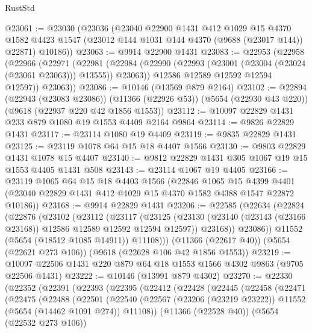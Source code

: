 \begin{lexlean}{RustStd}
\begin{coremodule}
@23061 := @23030
    (@23036
      (@23040
        @22900
        @1431
        @412
        @1029
        @15
        @4370
        @1582
        @4423
        @1547
        (@23012 @144 @1031 @144 @4370 (@9688 (@23017 @144)) @22871)
        @10186))
@23063 := @9914 @22900 @1431
@23083 := @22953
    (@22958
      (@22966
        (@22971
          (@22981
            (@22984 (@22990 (@22993 (@23001 (@23004 (@23024 (@23061 @23063))) @13555)) @23063))
            @12586
            @12589
            @12592
            @12594
            @12597))
        @23063))
@23086 := @10146 (@13569 @879 @2164)
@23102 := @22894
    (@22943 (@23083 @23086))
    (@11366 (@22926 @53))
    (@5654 (@22930 @43 @220))
    (@9618 (@22937 @220 @42 @1856 @1553))
@23112 := @10097 @22829 @1431 @233 @879 @1080 @19 @1553 @4409 @2164 @9864
@23114 := @9826 @22829 @1431
@23117 := @23114 @1080 @19 @4409
@23119 := @9835 @22829 @1431
@23125 := @23119 @1078 @64 @15 @18 @4407 @1566
@23130 := @9803 @22829 @1431 @1078 @15 @4407
@23140 := @9812 @22829 @1431 @305 @1067 @19 @15 @1553 @4405 @1431 @508
@23143 := @23114 @1067 @19 @4405
@23166 := @23119
    @1065
    @64
    @15
    @18
    @4403
    @1566
    (@22846
      @1065
      @15
      @4399
      @4401
      (@23040 @22829 @1431 @412 @1029 @15 @4370 @1582 @4388 @1547 @22872 @10186))
@23168 := @9914 @22829 @1431
@23206 := @22585
    (@22634
      (@22824
        (@22876
          (@23102
            (@23112
              (@23117
                (@23125
                  (@23130 (@23140 (@23143 (@23166 @23168)) @12586 @12589 @12592 @12594 @12597))
                  @23168))
              @23086))
          @11552
          (@5654 (@18512 @1085 @14911))
          @11108)))
    (@11366 (@22617 @40))
    (@5654 (@22621 @273 @106))
    (@9618 (@22628 @106 @42 @1856 @1553))
@23219 := @10097 @22506 @1431 @220 @879 @64 @18 @1553 @1566 @4302 @9863 (@9705 @22506 @1431)
@23222 := @10146 (@13991 @879 @4302)
@23270 := @22330
    (@22352
      (@22391
        (@22393
          (@22395
            (@22412
              (@22428
                (@22445
                  (@22458
                    (@22471
                      (@22475
                        (@22488
                          (@22501
                            (@22540
                              (@22567
                                (@23206 (@23219 @23222))
                                @11552
                                (@5654 (@14462 @1091 @274))
                                @11108))
                            (@11366 (@22528 @40))
                            (@5654 (@22532 @273 @106))

\end{coremodule}
\end{lexlean}
